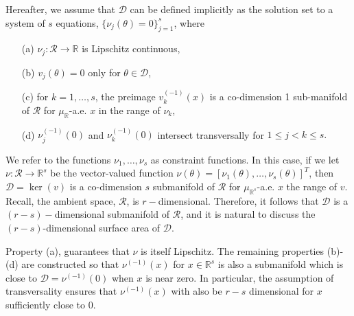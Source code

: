 \documentclass[10pt,fleqn]{article}
\DeclareMathOperator{\1}{\mathbbm{1}}
\begin{document}
Hereafter, we assume that $\mathcal{D}$ can be defined implicitly as the solution set to a system of $s$ equations,  $\{\nu_j(\theta)=0\}_{j=1}^s$, where 
\begin{itemize}
\item[(a)] $\nu_j:\mathcal{R}\to\mathbb{R}$ is Lipschitz continuous,
\item[(b)] $v_j(\theta)=0$ only for $\theta\in\mathcal{D}$,
\item[(c)] for $k=1,\dots, s$, the preimage $v_k^{(-1)}(x)$ is a co-dimension 1 sub-manifold of $\mathcal{R}$ for $\mu_\mathbb{R}$-a.e. $x$ in the range of $\nu_k$,
\item[(d)] $\nu_j^{(-1)}(0)$ and $\nu_k^{(-1)}(0)$ intersect transversally for $1\le j<k\le s.$
\end{itemize}
We refer to the functions $\nu_1,\dots,\nu_s$ as constraint functions. In this case, if we let $\nu:\mathcal{R}\to \mathbb{R}^s$ be the vector-valued function $\nu(\theta) = [\nu_1(\theta),\dots,\nu_s(\theta)]^T$, then $\mathcal{D} = \ker(v)$ is a co-dimension $s$ submanifold of $\mathcal{R}$ for $\mu_{\mathbb{R}^s}$-a.e. $x$ the range of $v.$  Recall, the ambient space, $\mathcal{R}$, is $r-$dimensional. Therefore, it follows that $\mathcal{D}$ is a $(r-s)-$dimensional submanifold of $\mathcal{R}$, and it is natural to discuss the $(r-s)$-dimensional surface area of $\mathcal{D}.$

Property (a), guarantees that $\nu$ is itself Lipschitz.  The remaining properties (b)-(d) are constructed so that $\nu^{(-1)}(x)$ for $x\in\mathbb{R}^s$ is also a submanifold which is close to $\mathcal{D}=\nu^{(-1)}(0)$ when $x$ is near zero.  In particular, the assumption of transversality ensures that $\nu^{(-1)}(x)$ with also be $r-s$ dimensional for $x$ sufficiently close to 0. 
\end{document}
